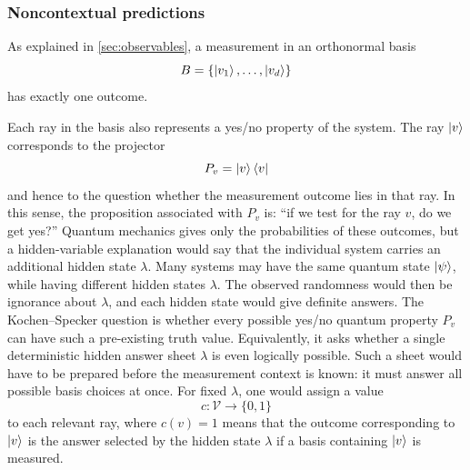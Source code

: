\subsubsection*{Noncontextual predictions}

As explained in \autoref{sec:observables}, a 
 measurement in an orthonormal basis
\[
B
=
\left\{\ket{v_1}, \allowbreak \ldots, \allowbreak\ket{v_d}\right\}
\]
has exactly one outcome.

Each ray in the basis also represents a yes/no property of the system.
The ray \(\ket v\) corresponds to the projector
\[
P_v
=
\ket v\bra v
\]
and hence to the question whether the measurement outcome lies in that ray.
In this sense, the proposition associated with \(P_v\) is:
``if we test for the ray \(v\), do we get yes?''
Quantum mechanics gives only the probabilities of these outcomes, but a hidden-variable explanation would say that the individual system carries an additional hidden state \(\lambda\).
Many systems may have the same quantum state \(\ket\psi\), while having different hidden states \(\lambda\).
The observed randomness would then be ignorance about \(\lambda\), and each hidden state would give definite answers.
The Kochen--Specker question is whether every possible yes/no quantum property \(P_v\) can have such a pre-existing truth value.
Equivalently, it asks whether a single deterministic hidden answer sheet \(\lambda\) is even logically possible.
Such a sheet would have to be prepared before the measurement context is known: it must answer all possible basis choices at once.
For fixed \(\lambda\), one would assign a value
\[
c:\mathcal V\to\{0,1\} %
\]
to each relevant ray, where \(c(v)=1\) means that the outcome corresponding to \(\ket v\) is the answer selected by the hidden state \(\lambda\) if a basis containing \(\ket v\) is measured.

\pagebreak[2]

